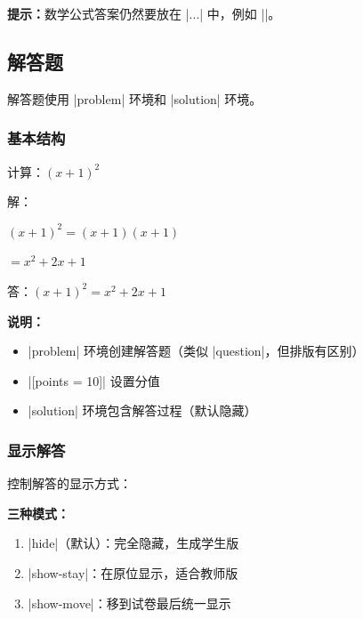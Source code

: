 \textbf{提示：}数学公式答案仍然要放在 |$...$| 中，例如 |\fillin[$x^2 + 1$]|。


\subsection{解答题}

解答题使用 |problem| 环境和 |solution| 环境。

\subsubsection{基本结构}

\begin{latexcode}
  \begin{problem}[points = 10]
    计算：$(x + 1)^2$

    \begin{solution}
      解：

      $(x + 1)^2 = (x + 1)(x + 1)$

      $= x^2 + 2x + 1$

      答：$(x + 1)^2 = x^2 + 2x + 1$
    \end{solution}
  \end{problem}
\end{latexcode}

\textbf{说明：}
\begin{itemize}
  \item |problem| 环境创建解答题（类似 |question|，但排版有区别）
  \item |[points = 10]| 设置分值
  \item |solution| 环境包含解答过程（默认隐藏）
\end{itemize}

\subsubsection{显示解答}

控制解答的显示方式：

\begin{latexcode}
\end{latexcode}

\textbf{三种模式：}
\begin{enumerate}
  \item |hide|（默认）：完全隐藏，生成学生版
  \item |show-stay|：在原位显示，适合教师版
  \item |show-move|：移到试卷最后统一显示
\end{enumerate}

